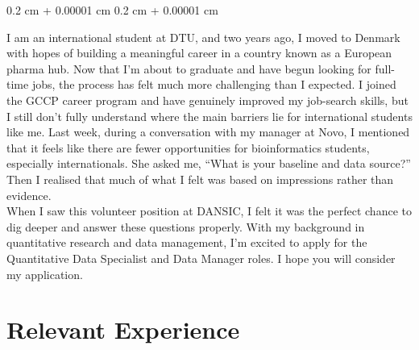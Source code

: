 \documentclass[10pt, letterpaper]{article}
\newenvironment{onecolentry}{
    \begin{adjustwidth}{
        0.2 cm + 0.00001 cm
    }{
        0.2 cm + 0.00001 cm
    }
}{
    \end{adjustwidth}
} %
\begin{document}
        
        \begin{onecolentry}
            I am an international student at DTU, and two years ago, I moved to Denmark with hopes of building a meaningful career in a country known as a European pharma hub. Now that I’m about to graduate and have begun looking for full-time jobs, the process has felt much more challenging than I expected. I joined the GCCP career program and have genuinely improved my job-search skills, but I still don’t fully understand where the main barriers lie for international students like me. Last week, during a conversation with my manager at Novo, I mentioned that it feels like there are fewer opportunities for bioinformatics students, especially internationals. She asked me, “What is your baseline and data source?” Then I realised that much of what I felt was based on impressions rather than evidence. \\

             \vspace{0.05 cm}
When I saw this volunteer position at DANSIC, I felt it was the perfect chance to dig deeper and answer these questions properly. With my background in quantitative research and data management, I’m excited to apply for the Quantitative Data Specialist and Data Manager roles. I hope you will consider my application.
        \end{onecolentry}

        \vspace{0.2 cm}
        
    \section{Relevant Experience}
\end{document}
